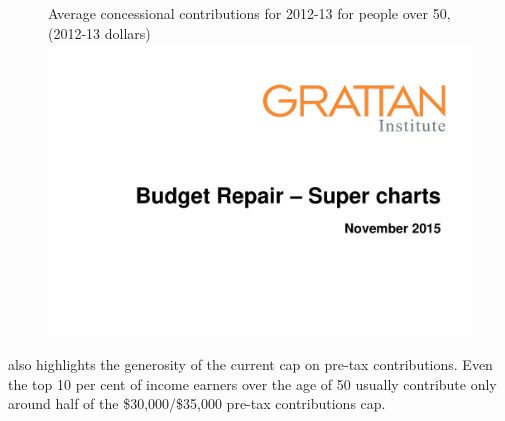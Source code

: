 \begin{figure}
%
{Average concessional contributions for 2012-13 for people over 50, (2012-13 dollars)}\label{fig:SUPER-4-4}
\includegraphics[width=\columnwidth,page=22]{super-atlas/PPTX.pdf}
\end{figure}

 also highlights the generosity of the current cap on pre-tax contributions. Even the top 10 per cent of income earners over the age of 50 usually contribute only around half of the \$30,000/\$35,000 pre-tax contributions cap. 

